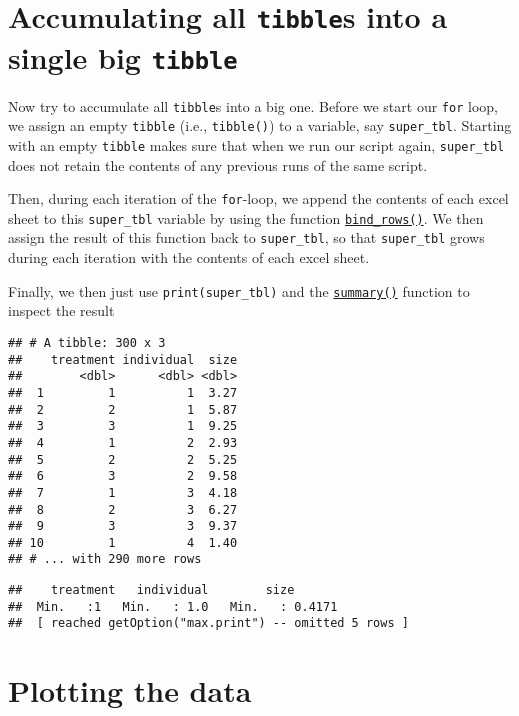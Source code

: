 \documentclass[
]{book}
\begin{document}
\hypertarget{accumulating-all-tibbles-into-a-single-big-tibble}{%
\section{\texorpdfstring{Accumulating all \texttt{tibble}s into a single big \texttt{tibble}}{Accumulating all tibbles into a single big tibble}}\label{accumulating-all-tibbles-into-a-single-big-tibble}}

Now try to accumulate all \texttt{tibble}s into a big one. Before we start our \texttt{for} loop, we assign an empty \texttt{tibble} (i.e., \texttt{tibble()}) to a variable, say \texttt{super\_tbl}. Starting with an empty \texttt{tibble} makes sure that when we run our script again, \texttt{super\_tbl} does not retain the contents of any previous runs of the same script.

Then, during each iteration of the \texttt{for}-loop, we append the contents of each excel sheet to this \texttt{super\_tbl} variable by using the function \href{https://dplyr.tidyverse.org/reference/bind.html}{\texttt{bind\_rows()}}. We then assign the result of this function back to \texttt{super\_tbl}, so that \texttt{super\_tbl} grows during each iteration with the contents of each excel sheet.

Finally, we then just use \texttt{print(super\_tbl)} and the \href{https://stat.ethz.ch/R-manual/R-patched/library/base/html/summary.html}{\texttt{summary()}} function to inspect the result

\begin{verbatim}
## # A tibble: 300 x 3
##    treatment individual  size
##        <dbl>      <dbl> <dbl>
##  1         1          1  3.27
##  2         2          1  5.87
##  3         3          1  9.25
##  4         1          2  2.93
##  5         2          2  5.25
##  6         3          2  9.58
##  7         1          3  4.18
##  8         2          3  6.27
##  9         3          3  9.37
## 10         1          4  1.40
## # ... with 290 more rows
\end{verbatim}

\begin{verbatim}
##    treatment   individual        size        
##  Min.   :1   Min.   : 1.0   Min.   : 0.4171  
##  [ reached getOption("max.print") -- omitted 5 rows ]
\end{verbatim}

\hypertarget{plotting-the-data}{%
\section{Plotting the data}\label{plotting-the-data}}
\end{document}

